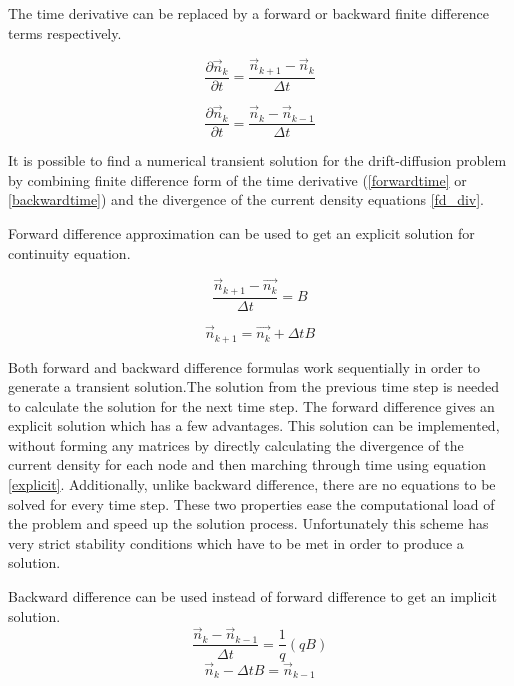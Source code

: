 \begin{doublespace}
The time derivative can be replaced by a forward or backward finite difference terms respectively.

\begin{equation}
\frac{\partial  \vec{n}_k}{\partial t}=\frac{ \vec{n}_{k+1}-\vec{n}_k}{\Delta t}
\label{forwardtime}
\end{equation}

\begin{equation}
\frac{\partial \vec{n}_k}{\partial t}=\frac{ \vec{n}_k- \vec{n}_{k-1}}{\Delta t}
\label{backwardtime}
\end{equation}

It is possible to find a numerical transient solution for the drift-diffusion problem by combining finite difference form of the time derivative (\eqref{forwardtime} or \eqref{backwardtime}) and the divergence of the current density equations \eqref{fd_div}.

Forward difference approximation can be used to get an explicit solution for continuity equation.

\begin{equation}\nonumber
\frac{ \vec{n}_{k+1}-\vec{n_k}}{\Delta t}=B
\end{equation}

\begin{equation}
\vec{n}_{k+1}=\vec{n_{k}}+\Delta t B
\label{explicit}
\end{equation}

Both forward and backward difference formulas work sequentially in order to generate a transient solution.The solution from the previous time step is needed to calculate the solution for the next time step. The forward difference gives an explicit solution which has a few advantages. This solution can be implemented, without forming any matrices by directly calculating the divergence of the current density for each node and then marching through time using equation \ref{explicit}. Additionally, unlike backward difference, there are no equations to be solved for every time step. These two properties ease the computational load of the problem and speed up the solution process. Unfortunately this scheme has very strict stability conditions which have to be met in order to produce a solution.

Backward difference can be used instead of forward difference to get an implicit solution.
\begin{equation}\nonumber
\frac{ \vec{n}_{k}-\vec{n}_{k-1}}{\Delta t}=\frac{1}{q}(qB)
\end{equation}
\begin{equation}\nonumber
\vec{n}_{k}-\Delta t B =\vec{n}_{k-1}
\end{equation}


\end{doublespace}
